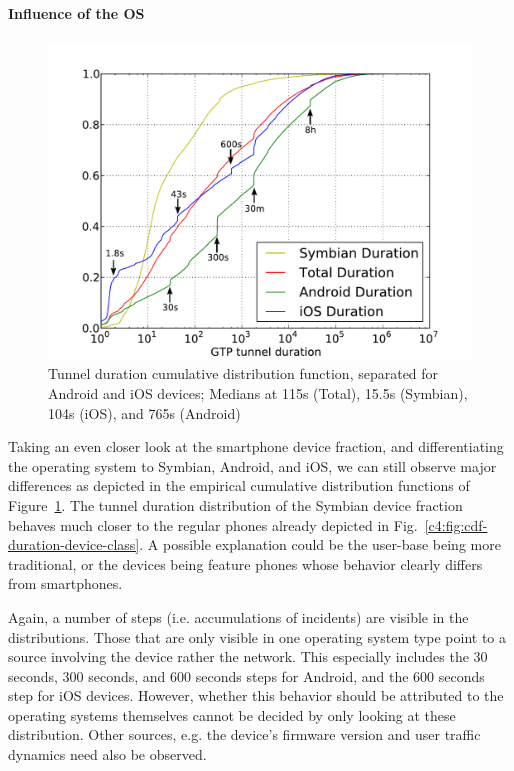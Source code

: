 \paragraph{Influence of the OS}

\begin{figure}[htbp]
    \centering
    \includegraphics[width=\columnwidth]{images/tunnel-dur-os-cdf-mod.pdf}
    \caption{Tunnel duration cumulative distribution function, separated for Android and iOS devices; Medians at 115s (Total), 15.5s (Symbian), 104s (iOS), and 765s (Android)}
    \label{c4:fig:cdf-duration-os}
\end{figure}

Taking an even closer look at the smartphone device fraction, and differentiating the operating system to Symbian, Android, and iOS, we can still observe major differences as depicted in the empirical cumulative distribution functions of Figure~\ref{c4:fig:cdf-duration-os}. The tunnel duration distribution of the Symbian device fraction behaves much closer to the regular phones already depicted in Fig.~\ref{c4:fig:cdf-duration-device-class}. A possible explanation could be the user-base being more traditional, or the devices being feature phones whose behavior clearly differs from smartphones.

Again, a number of steps (i.e. accumulations of incidents) are visible in the distributions. Those that are only visible in one operating system type point to a source involving the device rather the network. This especially includes the 30 seconds, 300 seconds, and 600 seconds steps for Android, and the 600 seconds step for iOS devices. However, whether this behavior should be attributed to the operating systems themselves cannot be decided by only looking at these distribution. Other sources, e.g. the device's firmware version and user traffic dynamics need also be observed.

